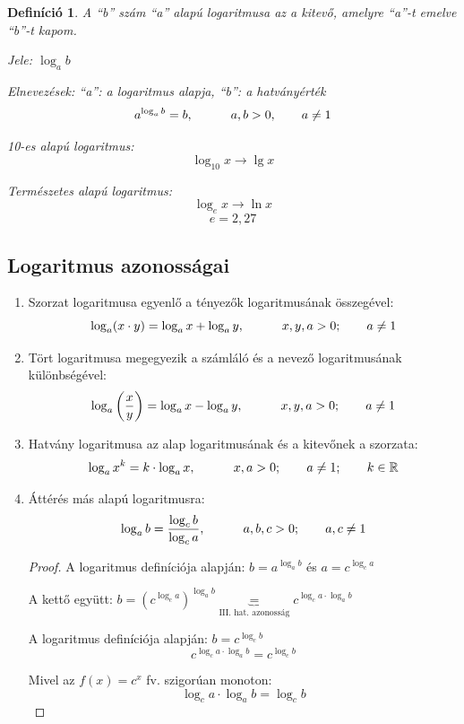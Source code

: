 \documentclass[12pt,a4paper]{article}
\newtheorem{definition}{Definíció} [section]
\begin{document}
\begin{definition}
A ``b'' szám ``a'' alapú logaritmusa az a kitevő, amelyre ``a''-t emelve ``b''-t kapom.

Jele: $\log_a b$

Elnevezések: ``a'': a logaritmus alapja, ``b'': a hatványérték
$$a^{\log_ab}=b, \hspace{30px} a,b>0, \hspace{20px} a \neq 1$$

10-es alapú logaritmus:
$$\log_{10}x\rightarrow\lg x $$

Természetes alapú logaritmus:
$$\log_{e}x\rightarrow\ln x $$
$$e=2,27$$
\end{definition}

\subsection{Logaritmus azonosságai}

\begin{enumerate}[label=\Roman*.]
\item Szorzat logaritmusa egyenlő a tényezők logaritmusának összegével:
$$\log_a(x\cdot y)=\log_a x + \log_ay, \hspace{30px} x,y,a>0;\hspace{20px} a\neq 1$$
\item Tört logaritmusa megegyezik a számláló és a nevező logaritmusának különbségével:
$$\log_a\left(\dfrac{x}{y}\right)=\log_ax-\log_ay, \hspace{30px} x,y,a>0;\hspace{20px} a\neq 1$$
\item Hatvány logaritmusa az alap logaritmusának és a kitevőnek a szorzata:
$$\log_ax^k=k\cdot \log_ax, \hspace{30px} x,a>0;\hspace{20px} a\neq 1;\hspace{20px} k\in \mathbb{R}$$
\item Áttérés más alapú logaritmusra:
$$\log_ab=\dfrac{\log_cb}{\log_ca}, \hspace{30px} a,b,c>0;\hspace{20px} a,c\neq 1$$
\begin{proof}
A logaritmus definíciója alapján: $b=a^{\log_ab}$ és $a=c^{\log_ca}$

A kettő együtt: $b=\left(c^{\log_ca}\right)^{\log_ab}\underbrace{=}_{\text{III. hat. azonosság}} c^{\log_ca\cdot \log_ab}$

A logaritmus definíciója alapján: $b=c^{\log_cb}$
$$c^{\log_ca\cdot \log_ab} = c^{\log_cb}$$

Mivel az $f(x)=c^x$ fv. szigorúan monoton:
$$\log_ca\cdot \log_ab = \log_cb$$
\end{proof}
\end{enumerate}
\end{document}
